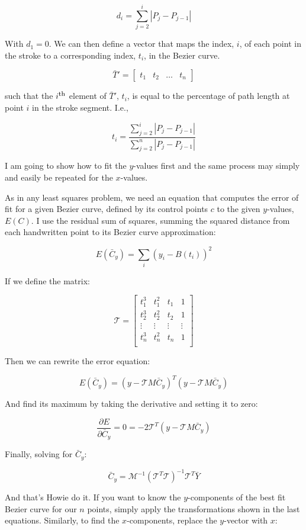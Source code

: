 \documentclass{article}
\newcommand{\Ith}{\ensuremath{i^\textrm{\footnotesize th}}}
\begin{document}
\[d_i=\sum_{j=2}^{i}|P_j-P_{j-1}|\]

With $d_1=0$.  We can then define a vector that maps the index, $i$, of each point in the stroke to a corresponding index, $t_i$, in the Bezier curve.

\[\bar{T}'=[\begin{array}{cccc} t_1 & t_2 & \ldots & t_n \end{array}]\]

such that the $\Ith$ element of $\bar{T}'$, $t_i$, is equal to the percentage of path length at point $i$ in the stroke segment.  I.e.,

\[t_i=\frac{\sum_{j=2}^{i}|P_j-P_{j-1}|}{\sum_{j=2}^{n}|P_j-P_{j-1}|}\]

I am going to show how to fit the $y$-values first and the same process may simply and easily be repeated for the $x$-values.

As in any least squares problem, we need an equation that computes the error of fit for a given Bezier curve, defined by its control points $c$ to the given $y$-values, $E(C)$. I use the residual sum of squares, summing the squared distance from each handwritten point to its Bezier curve approximation:

\[E(\bar{C}_y)=\sum_i(y_i-B(t_i))^2\]

If we define the matrix:

\[\mathcal{T}=\left[\begin{array}{rrrr}
       t_1^3 &  t_1^2 &  t_1   &      1 \\
       t_2^3 &  t_2^2 &  t_2   &      1 \\
      \vdots & \vdots & \vdots & \vdots \\
       t_n^3 &  t_n^2 &  t_n   &      1 \\
\end{array}\right]\]

Then we can rewrite the error equation:

\[E(\bar{C}_y)=(y-\mathcal{T}M\bar{C}_y)^T(y-\mathcal{T}M\bar{C}_y)\]

And find its maximum by taking the derivative and setting it to zero:

\[\frac{\partial E}{\partial \bar{C}_y} = 0 = -2\mathcal{T}^T(y-\mathcal{T}M\bar{C}_y)\]

Finally, solving for $\bar{C}_y$:

\[\bar{C}_y = \mathcal{M}^{-1}(\mathcal{T}^T\mathcal{T})^{-1}\mathcal{T}^T\bar{Y}\]

And that's Howie do it.  If you want to know the $y$-components of the best fit Bezier curve for our $n$ points, simply apply the transformations shown in the last equations. Similarly, to find the $x$-components, replace the $y$-vector with $x$:
\end{document}
